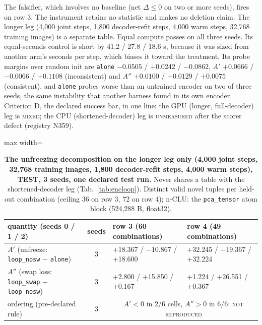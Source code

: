 \documentclass{article} %
\begin{document}
\noindent The falsifier, which involves no baseline (net $\Delta\le0$ on two or more seeds), fires on
row 3.
The instrument retains no statistic and makes no deletion claim. %
The longer leg (4,000 joint steps, 1,800 decoder-refit steps, 4,000 warm steps, 32,768 training
images) is a separate table. Equal compute passes on all three seeds. Its equal-seconds control is
short by 41.2 / 27.8 / 18.6 s, because it was sized from another arm's seconds per step, which
biases it toward the treatment. Its probe margins over random init are \texttt{alone} $-0.0505$ / $+0.0242$ /
$-0.0862$, $A'$ $+0.0666$ / $-0.0066$ / $+0.1108$ (inconsistent) and $A''$ $+0.0100$ / $+0.0129$ /
$+0.0075$ (consistent), and \texttt{alone} probes worse than an untrained encoder on two of three
seeds, the same instability that another harness found in its own encoder. %
Criterion D, the declared success bar, in one line: the GPU (longer, full-decoder) leg is \textsc{mixed}; the CPU (shortened-decoder) leg is \textsc{unmeasured} after the scorer defect (registry N359). %

\begin{table}[h]
\centering\small
\caption{\textbf{The unfreezing decomposition on the longer leg only (4,000 joint steps, %
32,768 training images, 1,800 decoder-refit steps, 4,000 warm steps), TEST, 3 seeds, %
one declared test run.} Never shares a table with the shortened-decoder leg
(Tab.~\ref{tab:encloop}). Distinct valid novel tuples per held-out combination (ceiling 36 on row 3, 72 on
row 4); n-CLU: the \texttt{pca\_tensor} atom block (524,288 B, float32).} %
\label{tab:bard-gpu}
\setlength{\tabcolsep}{2.4pt}
\begin{adjustbox}{max width=\linewidth}\begin{tabular}{lcp{4.6cm}p{4.6cm}}
\toprule
quantity (seeds 0 / 1 / 2) & seeds & row 3 (60 combinations) & row 4 (49 combinations) \\ %
\midrule
$A'$ (unfreeze: \texttt{loop\_nosw} $-$ \texttt{alone}) & 3 & +18.367 / $-10.867$ / +18.600 & +32.245 / $-19.367$ / +32.224 \\
$A''$ (swap loss: \texttt{loop\_swap} $-$ \texttt{loop\_nosw}) & 3 & +2.800 / +15.850 / +0.167 & +1.224 / +26.551 / +0.367 \\
ordering (pre-declared rule) & 3 & \multicolumn{2}{c}{$A'<0$ in 2/6 cells, $A''>0$ in 6/6: \textsc{not reproduced}} \\
\bottomrule
\end{tabular}\end{adjustbox}
\end{table}
\end{document}
